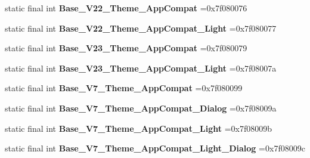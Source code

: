 \begin{DoxyCompactItemize}
\item 
\hypertarget{classcheck_1_1test_1_1_r_1_1style_ad38941fe1e9a3d2a28575aa4de5b0fe1}{}static final int {\bfseries Base\+\_\+\+V22\+\_\+\+Theme\+\_\+\+App\+Compat} =0x7f080076\label{classcheck_1_1test_1_1_r_1_1style_ad38941fe1e9a3d2a28575aa4de5b0fe1}

\item 
\hypertarget{classcheck_1_1test_1_1_r_1_1style_aba3c60252677c0999ab237f092a54009}{}static final int {\bfseries Base\+\_\+\+V22\+\_\+\+Theme\+\_\+\+App\+Compat\+\_\+\+Light} =0x7f080077\label{classcheck_1_1test_1_1_r_1_1style_aba3c60252677c0999ab237f092a54009}

\item 
\hypertarget{classcheck_1_1test_1_1_r_1_1style_af9f943f56512f6fea8af985770bb7e84}{}static final int {\bfseries Base\+\_\+\+V23\+\_\+\+Theme\+\_\+\+App\+Compat} =0x7f080079\label{classcheck_1_1test_1_1_r_1_1style_af9f943f56512f6fea8af985770bb7e84}

\item 
\hypertarget{classcheck_1_1test_1_1_r_1_1style_a063fe2ed3634a58e9a7bae8a9afd8b0d}{}static final int {\bfseries Base\+\_\+\+V23\+\_\+\+Theme\+\_\+\+App\+Compat\+\_\+\+Light} =0x7f08007a\label{classcheck_1_1test_1_1_r_1_1style_a063fe2ed3634a58e9a7bae8a9afd8b0d}

\item 
\hypertarget{classcheck_1_1test_1_1_r_1_1style_a958d9538b43f5a2fda44ab8cb6092490}{}static final int {\bfseries Base\+\_\+\+V7\+\_\+\+Theme\+\_\+\+App\+Compat} =0x7f080099\label{classcheck_1_1test_1_1_r_1_1style_a958d9538b43f5a2fda44ab8cb6092490}

\item 
\hypertarget{classcheck_1_1test_1_1_r_1_1style_aac9903f967ebbe2ba044d32edecc18f3}{}static final int {\bfseries Base\+\_\+\+V7\+\_\+\+Theme\+\_\+\+App\+Compat\+\_\+\+Dialog} =0x7f08009a\label{classcheck_1_1test_1_1_r_1_1style_aac9903f967ebbe2ba044d32edecc18f3}

\item 
\hypertarget{classcheck_1_1test_1_1_r_1_1style_a7f391f93716662ebdad630423bca25c8}{}static final int {\bfseries Base\+\_\+\+V7\+\_\+\+Theme\+\_\+\+App\+Compat\+\_\+\+Light} =0x7f08009b\label{classcheck_1_1test_1_1_r_1_1style_a7f391f93716662ebdad630423bca25c8}

\item 
\hypertarget{classcheck_1_1test_1_1_r_1_1style_ae59c456b978af7fbc2d248410002b66a}{}static final int {\bfseries Base\+\_\+\+V7\+\_\+\+Theme\+\_\+\+App\+Compat\+\_\+\+Light\+\_\+\+Dialog} =0x7f08009c\label{classcheck_1_1test_1_1_r_1_1style_ae59c456b978af7fbc2d248410002b66a}


\end{DoxyCompactItemize}
